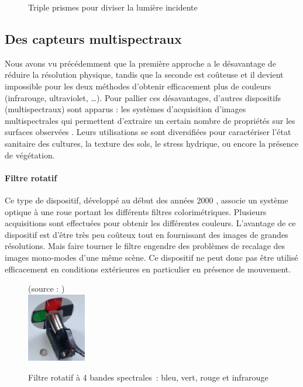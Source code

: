 \documentclass[../thesis.tex]{subfiles}
\begin{document}
    \begin{figure}[H]
        \centering
        
        \caption{Triple prismes pour diviser la lumière incidente}
        \label{fig:03-prism-sensors}
    \end{figure}
    
    \newpage
    \subsection{Des capteurs multispectraux}
    
    Nous avons vu précédemment que la première approche a le désavantage de réduire la résolution physique, tandis que la seconde est coûteuse et il devient impossible pour les deux méthodes d'obtenir efficacement plus de couleurs (infrarouge, ultraviolet, \dots). Pour pallier ces désavantages, d'autres dispositifs (multispectraux) sont apparus : les systèmes d'acquisition d'images multispectrales qui permettent d'extraire un certain nombre de propriétés sur les surfaces observées \cite{Qiu:2018:10.25165}. Leurs utilisations se sont diversifiées pour caractériser l'état sanitaire des cultures, la texture des sols, le stress hydrique, ou encore la présence de végétation.
    
    \paragraph{Filtre rotatif}
    
    Ce type de dispositif, développé au début des années 2000 \cite{vioix2004}, associe un système optique à une roue portant les différents filtres colorimétriques. Plusieurs acquisitions sont effectuées pour obtenir les différentes couleurs. L'avantage de ce dispositif est d'être très peu coûteux tout en fournissant des images de grandes résolutions. Mais faire tourner le filtre engendre des problèmes de recalage des images mono-modes d'une même scène. Ce dispositif ne peut donc pas être utilisé efficacement en conditions extérieures en particulier en présence de mouvement.
    
    \begin{figure}[H]
        \centering
        {\scriptsize (source : \cite{vioix2004}) } \\
        \includegraphics[height=3cm]{img/biblio/spinning-color}
        \caption{Filtre rotatif à 4 bandes spectrales : bleu, vert, rouge et infrarouge}
        \label{fig:03-spinning-color}
    \end{figure}
    
\end{document}
